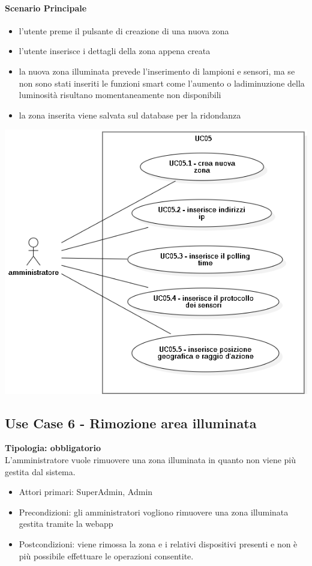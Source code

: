 \documentclass[12pt]{article}
\begin{document}
\paragraph{Scenario Principale}
\begin{itemize}
	\item l'utente preme il pulsante di creazione di una nuova zona
	\item l'utente inserisce i dettagli della zona appena creata
	\item la nuova zona illuminata prevede l'inserimento di lampioni e sensori, ma se non sono stati inseriti le funzioni smart come l'aumento o ladiminuzione della luminosità risultano momentaneamente non disponibili
	\item la zona inserita viene salvata sul database per la ridondanza
\end{itemize}

\includegraphics[scale=0.5]{UC05.png}

\subsection{Use Case 6 - Rimozione area illuminata}
\textbf{Tipologia: obbligatorio} \\
L'amministratore vuole rimuovere una zona illuminata in quanto non viene più gestita dal sistema.
\begin{itemize}
	\item Attori primari: SuperAdmin, Admin
	\item Precondizioni: gli amministratori vogliono rimuovere una zona illuminata gestita tramite la webapp
	\item Postcondizioni: viene rimossa la zona e i relativi dispositivi presenti e non è più possibile effettuare le operazioni consentite.
\end{itemize}
\end{document}
